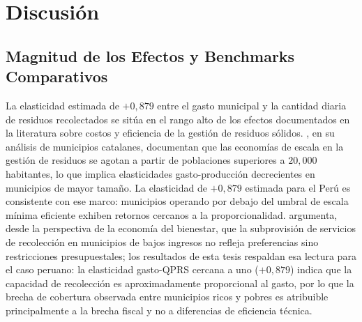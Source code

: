 
\section{Discusión}
\label{sec:discusion}

\subsection{Magnitud de los Efectos y Benchmarks Comparativos}
\label{sec:benchmarks}

La elasticidad estimada de $+0{,}879$ entre el gasto municipal y la cantidad diaria de residuos recolectados se sitúa en el rango alto de los efectos documentados en la literatura sobre costos y eficiencia de la gestión de residuos sólidos. \citet{Bel2010}, en su análisis de municipios catalanes, documentan que las economías de escala en la gestión de residuos se agotan a partir de poblaciones superiores a $20{,}000$ habitantes, lo que implica elasticidades gasto-producción decrecientes en municipios de mayor tamaño. La elasticidad de $+0{,}879$ estimada para el Perú es consistente con ese marco: municipios operando por debajo del umbral de escala mínima eficiente exhiben retornos cercanos a la proporcionalidad. \citet{Kinnaman2006} argumenta, desde la perspectiva de la economía del bienestar, que la subprovisión de servicios de recolección en municipios de bajos ingresos no refleja preferencias sino restricciones presupuestales; los resultados de esta tesis respaldan esa lectura para el caso peruano: la elasticidad gasto-QPRS cercana a uno ($+0{,}879$) indica que la capacidad de recolección es aproximadamente proporcional al gasto, por lo que la brecha de cobertura observada entre municipios ricos y pobres es atribuible principalmente a la brecha fiscal y no a diferencias de eficiencia técnica.

